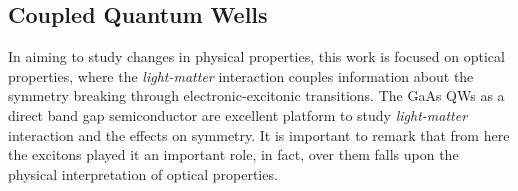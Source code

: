 \subsection{Coupled Quantum Wells}
\label{subsubsec:chapter-2-coupled-quantum-wells}
\vspace{-10mm}
In aiming to study changes in physical properties, this work is focused on optical properties, where the \emph{light-matter} interaction couples information about the symmetry breaking through electronic-excitonic transitions. The GaAs QWs as a direct band gap semiconductor are excellent platform to study \emph{light-matter}  interaction and the effects on symmetry. It is important to remark that from here the excitons played it an important role, in fact, over them falls upon  the physical interpretation of optical properties.

